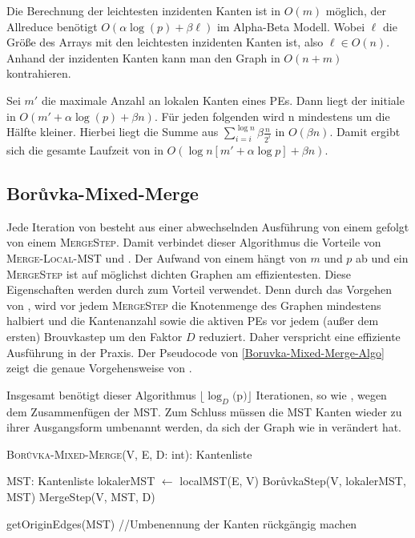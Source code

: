 Die Berechnung der leichtesten inzidenten Kanten ist in $O(m)$ möglich, der Allreduce benötigt $O(\alpha \log(p)+\beta \ell)$ im Alpha-Beta Modell. Wobei $\ell$ die Größe des Arrays mit den leichtesten inzidenten Kanten ist, also $\ell \in O(n)$.
Anhand der inzidenten Kanten kann man den Graph in $O(n + m)$ kontrahieren.


Sei $m'$ die maximale Anzahl an lokalen Kanten eines PEs.
Dann liegt der initiale \boruvkaStep \space in $O(m'+ \alpha \log(p)+\beta n)$.
Für jeden folgenden \boruvkaStep \space wird n mindestens um die Hälfte kleiner. Hierbei liegt die Summe aus $\sum_{i=i}^{\log n} \beta \frac{n}{2^i}$ in $O(\beta n)$.
Damit ergibt sich die gesamte Laufzeit von \boruvkaAllreduce in $O(\log n [m' + \alpha \log p]  +\beta n)$.




\subsection{Bor{\r u}vka-Mixed-Merge}
Jede Iteration von \boruvkaMixedMerge besteht aus einer abwechselnden Ausführung von einem \boruvkaStep \space gefolgt von einem \textsc{MergeStep}.
Damit verbindet dieser Algorithmus die Vorteile von \textsc{Merge-Local-MST} und \boruvkaAllreduce.
Der Aufwand von einem \boruvkaStep \space hängt von $m$ und $p$ ab und ein \textsc{MergeStep} ist auf möglichst dichten Graphen am effizientesten. Diese Eigenschaften werden durch \boruvkaMixedMerge zum Vorteil verwendet.
Denn durch das Vorgehen von \boruvkaMixedMerge, wird vor jedem \textsc{MergeStep} die Knotenmenge des Graphen mindestens halbiert und die Kantenanzahl sowie die aktiven PEs vor jedem (außer dem ersten) Brouvkastep um den Faktor $D$ reduziert.
Daher verspricht \boruvkaMixedMerge eine effiziente Ausführung in der Praxis.
Der Pseudocode von \cref{Boruvka-Mixed-Merge-Algo} zeigt die genaue Vorgehensweise von \boruvkaMixedMerge.

Insgesamt benötigt dieser Algorithmus $\lfloor \log_{D}($p$) \rfloor $ Iterationen, so wie \mergeMST, wegen dem Zusammenfügen der MST.
Zum Schluss müssen die MST Kanten wieder zu ihrer Ausgangsform umbenannt werden, da sich der Graph wie in \boruvkaAllreduce verändert hat.\\


\begin{algorithm} 
\caption{\textsc{Bor{\r u}vka-Mixed-Merge}(V, E, D: int): Kantenliste}
\begin{algorithmic}[1]
\label{Boruvka-Mixed-Merge-Algo}

\STATE MST: Kantenliste
\STATE lokalerMST $\gets$ localMST(E, V)
    \STATE Bor{\r u}vkaStep(V, lokalerMST, MST)
    \STATE MergeStep(V, MST, D)
\ENDFOR

\RETURN getOriginEdges(MST) //Umbenennung der Kanten rückgängig machen
\end{algorithmic}
\end{algorithm}

